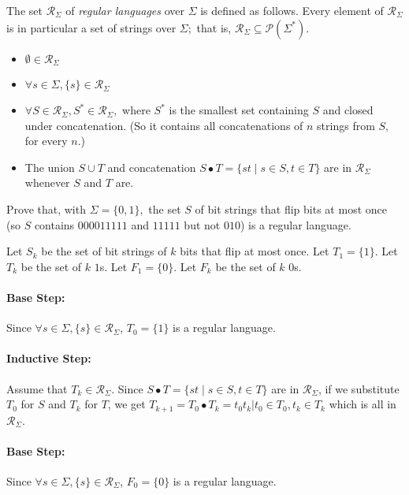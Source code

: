 \documentclass[letterpaper,12pt,addpoints,answers]{exam}
\begin{document}
\begin{questions}
    The set $\mathcal R_\Sigma$
    of \emph{regular languages} over $\Sigma$ is defined
    as follows. Every element of $\mathcal R_\Sigma$ is
    in particular a set of strings over $\Sigma;$ that is, $\mathcal R_\Sigma\subseteq \mathcal P(\Sigma^*).$
    \begin{itemize}
        \item $\emptyset\in \mathcal R_\Sigma$
        \item $\forall s\in \Sigma, \{s\}\in \mathcal R_\Sigma$
        \item $\forall S \in \mathcal R_\Sigma, S^*\in \mathcal R_\Sigma,$ where $S^*$ is the smallest set
              containing $S$ and closed under concatenation. (So it contains all concatenations of $n$ strings from $S,$ for every $n.$)
        \item The union $S\cup T$ and concatenation $S\bullet T=\{st\mid s\in S,t\in T\}$ are in $\mathcal R_\Sigma$ whenever $S$ and $T$ are.
    \end{itemize}

    Prove that, with $\Sigma=\{0,1\},$ the set $S$ of
    bit strings that flip bits at most once (so
    $S$ contains $000011111$ and $11111$ but not $010$) is
    a regular language.
    \begin{solutionorlines}[7in]
        Let $S_k$ be the set of bit strings of $k$ bits that flip at most once.
        Let $T_1 = \{1\}$.
        Let $T_k$ be the set of $k$ $1$s.
        Let $F_1 = \{0\}$.
        Let $F_k$ be the set of $k$ $0$s.

        \paragraph{Base Step:} Since $\forall s \in \Sigma, \{s\} \in \mathcal R_\Sigma$, $T_0 = \{1\}$ is a regular language.
        \paragraph{Inductive Step:}
        Assume that $T_k \in \mathcal R_\Sigma$.
        Since $S\bullet T=\{st\mid s\in S,t\in T\}$ are in $\mathcal R_\Sigma$,
        if we substitute $T_0$ for $S$ and $T_k$ for $T$,
        we get $T_{k+1} = T_0 \bullet T_k = {t_0t_k | t_0 \in T_0, t_k \in T_k}$
        which is all in $\mathcal R_\Sigma$.

        \paragraph{Base Step:} Since $\forall s \in \Sigma, \{s\} \in \mathcal R_\Sigma$, $F_0 = \{0\}$ is a regular language.

\end{solutionorlines}
\end{questions}
\end{document}
